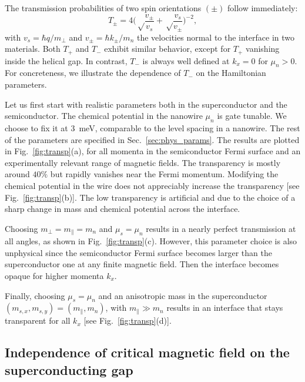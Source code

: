 The transmission probabilities of two spin orientations $(\pm)$ follow immediately:
\begin{equation}
T_\pm=4
\bigg(\sqrt\frac{v_\pm}{v_s}+\sqrt\frac{v_s}{v_\pm}\bigg)^{-2},
\end{equation}
with $v_s=\hbar q/m_\perp$ and $v_\pm=\hbar k_\pm/m_n$ the velocities normal to the interface in two materials.
Both $T_+$ and $T_-$ exhibit similar behavior, except for $T_+$ vanishing inside the helical gap.
In contrast, $T_-$ is always well defined at $k_x=0$ for $\mu_n>0$.
For concreteness, we illustrate the dependence of $T_-$ on the Hamiltonian parameters.

Let us first start with realistic parameters both in the superconductor and the semiconductor.
The chemical potential in the nanowire $\mu_n$ is gate tunable.
We choose to fix it at \SI{3}{\meV}, comparable to the level spacing in a nanowire.
The rest of the parameters are specified in Sec.~\ref{sec:phys_params}.
The results are plotted in Fig.~\ref{fig:transp}(a), for all momenta in the semiconductor Fermi surface and an experimentally relevant range of magnetic fields.
The transparency is mostly around $40\%$ but rapidly vanishes near the Fermi momentum.
Modifying the chemical potential in the wire does not appreciably increase the transparency [see Fig.~\ref{fig:transp}(b)].
The low transparency is artificial and due to the choice of a sharp change in mass and chemical potential across the interface.

Choosing $m_\perp = m_\parallel = m_n$ and $\mu_s = \mu_n$ results in a nearly perfect transmission at all angles, as shown in Fig.~\ref{fig:transp}(c).
However, this parameter choice is also unphysical since the semiconductor Fermi surface becomes larger than the superconductor one at any finite magnetic field.
Then the interface becomes opaque for higher momenta $k_x$.

Finally, choosing $\mu_s = \mu_n$ and an anisotropic mass in the superconductor $(m_{s,x},m_{s,y})=(m_\parallel, m_n)$, with $m_\parallel \gg m_n$ results in an interface that stays transparent for all $k_x$ [see Fig.~\ref{fig:transp}(d)].

\subsection{Independence of critical magnetic field on the superconducting gap}
\label{sec:app2}

